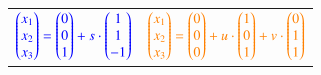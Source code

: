 \begin{tabular}{ll}
	${\color{blue}\begin{pmatrix} x_1 \\ x_2 \\ x_3 \end{pmatrix} = 
	\begin{pmatrix} 0 \\ 0 \\ 1 \end{pmatrix} + s \cdot 
	\begin{pmatrix} 1 \\ 1 \\ -1\end{pmatrix}}$
	&
	${\color{orange}\begin{pmatrix} x_1 \\ x_2 \\ x_3 \end{pmatrix} = 
	\begin{pmatrix} 0 \\ 0 \\ 0 \end{pmatrix} + u \cdot 
	\begin{pmatrix} 1 \\ 0 \\ 1\end{pmatrix} + v \cdot 
	\begin{pmatrix} 0 \\ 1 \\ 1\end{pmatrix}}$
\end{tabular}

\vspace{0.2cm}


